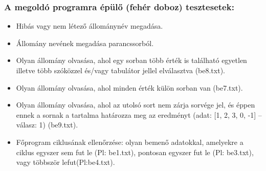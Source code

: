 \documentclass[a4paper]{article}
\begin{document}
    \subsubsection{A megoldó programra épülő (fehér doboz) tesztesetek:}
      \begin{itemize}
        \item Hibás vagy nem létező állománynév megadása.
        \item Állomány nevének megadása parancssorból.
        \item Olyan állomány olvasása, ahol egy sorban több érték is található egyetlen illetve több szóközzel és/vagy tabulátor jellel elválasztva (be8.txt).
        \item Olyan állomány olvasása, ahol minden érték külön sorban van (be7.txt).
        \item Olyan állomány olvasása, ahol az utolsó sort nem zárja sorvége jel, és éppen ennek a sornak a tartalma határozza meg az eredményt (adat: [1, 2, 3, 0, -1] – válasz: 1) (be9.txt).
        \item Főprogram ciklusának ellenőrzése: olyan bemenő adatokkal, amelyekre a ciklus egyszer sem fut le (Pl: be1.txt), pontosan egyszer fut le (Pl: be3.txt), vagy többször lefut(Pl:be4.txt).
      \end{itemize}
\end{document}
